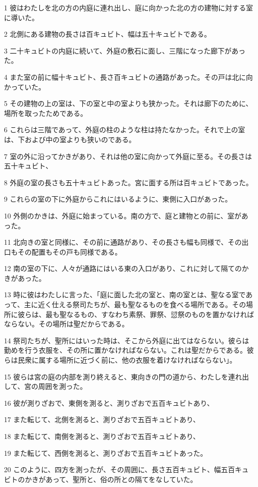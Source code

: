 \par 1 彼はわたしを北の方の内庭に連れ出し、庭に向かった北の方の建物に対する室に導いた。
\par 2 北側にある建物の長さは百キュビト、幅は五十キュビトである。
\par 3 二十キュビトの内庭に続いて、外庭の敷石に面し、三階になった廊下があった。
\par 4 また室の前に幅十キュビト、長さ百キュビトの通路があった。その戸は北に向かっていた。
\par 5 その建物の上の室は、下の室と中の室よりも狭かった。それは廊下のために、場所を取ったためである。
\par 6 これらは三階であって、外庭の柱のような柱は持たなかった。それで上の室は、下および中の室よりも狭いのである。
\par 7 室の外に沿ってかきがあり、それは他の室に向かって外庭に至る。その長さは五十キュビト、
\par 8 外庭の室の長さも五十キュビトあった。宮に面する所は百キュビトであった。
\par 9 これらの室の下に外庭からこれにはいるように、東側に入口があった。
\par 10 外側のかきは、外庭に始まっている。南の方で、庭と建物との前に、室があった。
\par 11 北向きの室と同様に、その前に通路があり、その長さも幅も同様で、その出口もその配置もその戸も同様である。
\par 12 南の室の下に、人々が通路にはいる東の入口があり、これに対して隔てのかきがあった。
\par 13 時に彼はわたしに言った、「庭に面した北の室と、南の室とは、聖なる室であって、主に近く仕える祭司たちが、最も聖なるものを食べる場所である。その場所に彼らは、最も聖なるもの、すなわち素祭、罪祭、愆祭のものを置かなければならない。その場所は聖だからである。
\par 14 祭司たちが、聖所にはいった時は、そこから外庭に出てはならない。彼らは勤めを行う衣服を、その所に置かなければならない。これは聖だからである。彼らは民衆に属する場所に近づく前に、他の衣服を着けなければならない」。
\par 15 彼らは宮の庭の内部を測り終えると、東向きの門の道から、わたしを連れ出して、宮の周囲を測った。
\par 16 彼が測りざおで、東側を測ると、測りざおで五百キュビトあり、
\par 17 また転じて、北側を測ると、測りざおで五百キュビトあり、
\par 18 また転じて、南側を測ると、測りざおで五百キュビトあり、
\par 19 また転じて、西側を測ると、測りざおで五百キュビトあった。
\par 20 このように、四方を測ったが、その周囲に、長さ五百キュビト、幅五百キュビトのかきがあって、聖所と、俗の所との隔てをなしていた。


